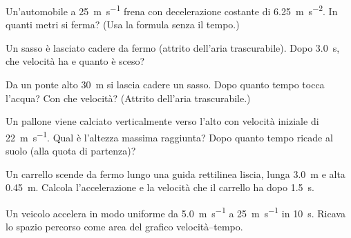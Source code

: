 \begin{esercizio}
Un'automobile a \SI{25}{\metre\per\second} frena con decelerazione costante di \SI{6,25}{\metre\per\second\squared}. In quanti metri si ferma? (Usa la formula senza il tempo.)\\
\end{esercizio}

\begin{esercizio}
Un sasso è lasciato cadere da fermo (attrito dell'aria trascurabile). Dopo \SI{3,0}{\second}, che velocità ha e quanto è sceso?\\
\end{esercizio}

\begin{esercizio}
Da un ponte alto \SI{30}{\metre} si lascia cadere un sasso. Dopo quanto tempo tocca l'acqua? Con che velocità? (Attrito dell'aria trascurabile.)\\
\end{esercizio}

\begin{esercizio}
Un pallone viene calciato verticalmente verso l'alto con velocità iniziale di \SI{22}{\metre\per\second}. Qual è l'altezza massima raggiunta? Dopo quanto tempo ricade al suolo (alla quota di partenza)?\\
\end{esercizio}

\begin{esercizio}
Un carrello scende da fermo lungo una guida rettilinea liscia, lunga \SI{3,0}{\metre} e alta \SI{0,45}{\metre}. Calcola l'accelerazione e la velocità che il carrello ha dopo \SI{1,5}{\second}.\\
\end{esercizio}

\begin{esercizio}
Un veicolo accelera in modo uniforme da \SI{5,0}{\metre\per\second} a \SI{25}{\metre\per\second} in \SI{10}{\second}. Ricava lo spazio percorso come area del grafico velocità--tempo.\\
\end{esercizio}


